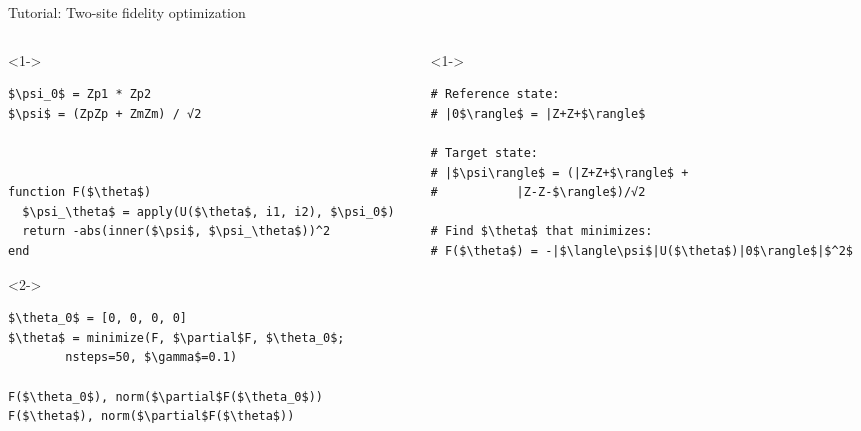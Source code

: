 \begin{frame}[fragile]{Tutorial: Two-site fidelity optimization}


\begin{columns}

\begin{column}{5cm}

\begin{onlyenv}<1->

\begin{lstlisting}[language=JuliaLocal, style=julia, mathescape, basicstyle=\small]
$\psi_0$ = Zp1 * Zp2
$\psi$ = (ZpZp + ZmZm) / √2



function F($\theta$)
  $\psi_\theta$ = apply(U($\theta$, i1, i2), $\psi_0$)
  return -abs(inner($\psi$, $\psi_\theta$))^2
end
\end{lstlisting}

\end{onlyenv}

\begin{onlyenv}<2->

\begin{lstlisting}[language=JuliaLocal, style=julia, mathescape, basicstyle=\small]
$\theta_0$ = [0, 0, 0, 0]
$\theta$ = minimize(F, $\partial$F, $\theta_0$;
        nsteps=50, $\gamma$=0.1)

F($\theta_0$), norm($\partial$F($\theta_0$))
F($\theta$), norm($\partial$F($\theta$))
 \end{lstlisting}

\end{onlyenv}

\end{column}

\begin{column}{5cm}

\begin{onlyenv}<1->

\begin{lstlisting}[style=julia, numbers=none, mathescape, basicstyle=\small]
# Reference state:
# |0$\rangle$ = |Z+Z+$\rangle$

# Target state:
# |$\psi\rangle$ = (|Z+Z+$\rangle$ +
#           |Z-Z-$\rangle$)/√2

# Find $\theta$ that minimizes:
# F($\theta$) = -|$\langle\psi$|U($\theta$)|0$\rangle$|$^2$
\end{lstlisting}

\end{onlyenv}


\end{column}
\end{columns}
\end{frame}

